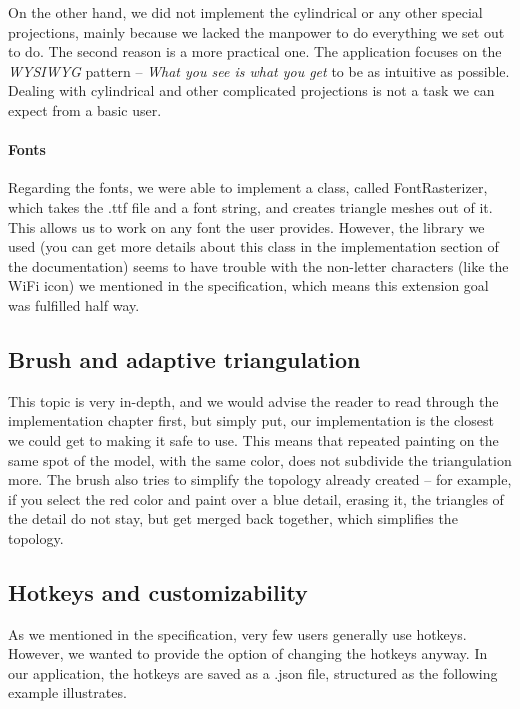 On the other hand, we did not implement the cylindrical or any other special projections, mainly because we lacked the manpower to do everything we set out to do. The second reason is a more practical one. The application focuses on the \textit{WYSIWYG} pattern -- \textit{What you see is what you get} to be as intuitive as possible. Dealing with cylindrical and other complicated projections is not a task we can expect from a basic user.

\paragraph{Fonts}

Regarding the fonts, we were able to implement a class, called FontRasterizer, which takes the .ttf file and a font string, and creates triangle meshes out of it. This allows us to work on any font the user provides. However, the library we used (you can get more details about this class in the implementation section of the documentation) seems to have trouble with the non-letter characters (like the WiFi icon) we mentioned in the specification, which means this extension goal was fulfilled half way.

\subsection{Brush and adaptive triangulation}

This topic is very in-depth, and we would advise the reader to read through the implementation chapter first, but simply put, our implementation is the closest we could get to making it safe to use. This means that repeated painting on the same spot of the model, with the same color, does not subdivide the triangulation more. The brush also tries to simplify the topology already created -- for example, if you select the red color and paint over a blue detail, erasing it, the triangles of the detail do not stay, but get merged back together, which simplifies the topology.

\subsection{Hotkeys and customizability}

As we mentioned in the specification, very few users generally use hotkeys. However, we wanted to provide the option of changing the hotkeys anyway. In our application, the hotkeys are saved as a .json file, structured as the following example illustrates.

